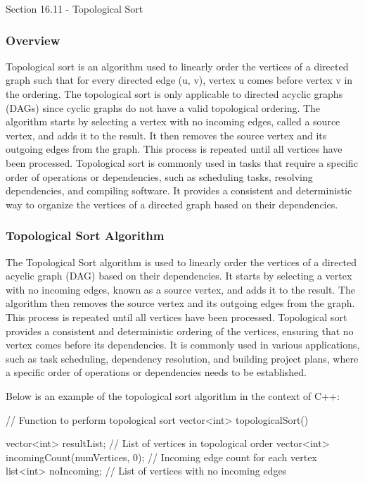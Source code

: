 \begin{notes}{Section 16.11 - Topological Sort}
    \subsubsection*{Overview}

    Topological sort is an algorithm used to linearly order the vertices of a directed graph such that for every directed edge (u, v), vertex u comes before vertex v in the ordering. The topological sort is only applicable to directed 
    acyclic graphs (DAGs) since cyclic graphs do not have a valid topological ordering. The algorithm starts by selecting a vertex with no incoming edges, called a source vertex, and adds it to the result. It then removes the source vertex 
    and its outgoing edges from the graph. This process is repeated until all vertices have been processed. Topological sort is commonly used in tasks that require a specific order of operations or dependencies, such as scheduling tasks, 
    resolving dependencies, and compiling software. It provides a consistent and deterministic way to organize the vertices of a directed graph based on their dependencies.
    
    \subsubsection*{Topological Sort Algorithm}
    
    The Topological Sort algorithm is used to linearly order the vertices of a directed acyclic graph (DAG) based on their dependencies. It starts by selecting a vertex with no incoming edges, known as a source vertex, and adds it to the result. 
    The algorithm then removes the source vertex and its outgoing edges from the graph. This process is repeated until all vertices have been processed. Topological sort provides a consistent and deterministic ordering of the vertices, ensuring 
    that no vertex comes before its dependencies. It is commonly used in various applications, such as task scheduling, dependency resolution, and building project plans, where a specific order of operations or dependencies needs to be established.
    
    \begin{highlight}
        Below is an example of the topological sort algorithm in the context of C++:
    
    \begin{code}[C++]
    // Function to perform topological sort
    vector<int> topologicalSort() {
        vector<int> resultList; // List of vertices in topological order
        vector<int> incomingCount(numVertices, 0); // Incoming edge count for each vertex
        list<int> noIncoming; // List of vertices with no incoming edges
    
}
\end{code}
\end{highlight}
\end{notes}
